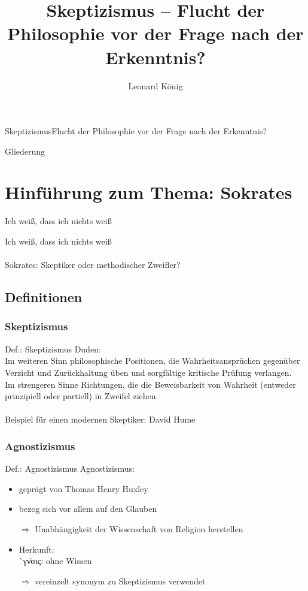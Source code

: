 \documentclass[12pt]{beamer}
\author{Leonard König}
\title[Skeptizismus]{Skeptizismus – Flucht der Philosophie vor der Frage nach der Erkenntnis?}
\institute{Herder-Gymnasium}
\begin{document}
\begin{frame}{Skeptizismus}{Flucht der Philosophie vor der Frage nach der Erkenntnis?}
\titlepage
\end{frame}

\begin{frame}{Gliederung}
\tableofcontents
\end{frame}


\section{Hinführung zum Thema: Sokrates}
\begin{frame}{\glqq Ich weiß, dass ich nichts weiß\grqq}
\begin{center}
\glqq Ich weiß, dass ich nichts weiß\grqq\\
\ \\
Sokrates: Skeptiker oder methodischer Zweifler?
\end{center}
\end{frame}

\subsection{Definitionen}
\subsubsection{Skeptizismus}
\begin{frame}{Def.: Skeptizismus}
Duden:\\
\glqq Im weiteren Sinn philosophische Positionen, die Wahrheitsansprüchen gegenüber Verzicht und Zurückhaltung üben und sorgfältige kritische Prüfung verlangen.\\
Im strengeren Sinne Richtungen, die die Beweisbarkeit von Wahrheit (entweder prinzipiell oder partiell) in Zweifel ziehen.\grqq\\
\ \\
Beispiel für einen modernen Skeptiker: David Hume
\end{frame}		

\subsubsection{Agnostizismus}
\begin{frame}{Def.: Agnostizismus}
Agnostizismus:
\begin{itemize}
\item geprägt von Thomas Henry Huxley
\item bezog sich vor allem auf den Glauben
\item[$\Rightarrow$] Unabhängigkeit der Wissenschaft von Religion herstellen
\item Herkunft: \\
{\`{\textalpha}γν\={\textomega}σις}: \glqq ohne Wissen\grqq\
\item[$\Rightarrow$] vereinzelt synonym zu Skeptizismus verwendet
\end{itemize}
\end{frame}
\end{document}
